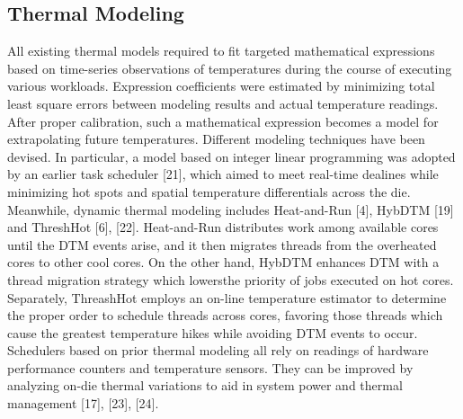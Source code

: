 \documentclass[times, 10pt,twocolumn]{IEEEtran}
\begin{document}
\subsection{Thermal Modeling}
\label{sec:thermal-modeling}
All existing thermal models required to fit targeted mathematical expressions based on time-series observations of temperatures during the course of executing various workloads.
Expression coefficients were estimated by minimizing total least square errors between modeling results and actual temperature readings.
After proper calibration, such a mathematical expression becomes a model for extrapolating future temperatures.
Different modeling techniques have been devised.
In particular, a model based on integer linear programming was adopted by an earlier task scheduler [21], which aimed to meet real-time dealines while minimizing hot spots and spatial temperature differentials across the die.
Meanwhile, dynamic thermal modeling includes Heat-and-Run [4], HybDTM [19] and ThreshHot [6], [22].
Heat-and-Run distributes work among available cores until the DTM events arise, and it then migrates threads from the overheated cores to other cool cores.
On the other hand, HybDTM enhances DTM with a thread migration strategy which lowersthe priority of jobs executed on hot cores.
Separately, ThreashHot employs an on-line temperature estimator to determine the proper order to schedule threads across cores, favoring those threads which cause the greatest temperature hikes while avoiding DTM events to occur.
Schedulers based on prior thermal modeling all rely on readings of hardware performance counters and temperature sensors.
They can be improved by analyzing on-die thermal variations to aid in system power and thermal management [17], [23], [24].
\end{document}

